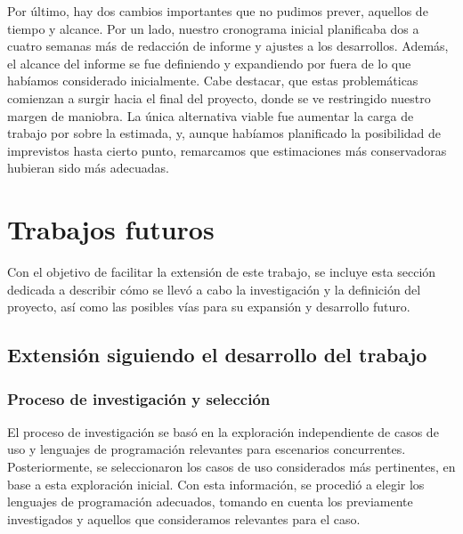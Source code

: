 \documentclass[11pt]{article}
\let\Oldsection\section
\renewcommand{\section}{\FloatBarrier\Oldsection}
\let\Oldsubsection\subsection
\renewcommand{\subsection}{\FloatBarrier\Oldsubsection}
\let\Oldsubsubsection\subsubsection
\renewcommand{\subsubsection}{\FloatBarrier\Oldsubsubsection}
\begin{document}
Por último, hay dos cambios importantes que no pudimos prever, aquellos de tiempo y alcance. Por un lado, nuestro cronograma inicial planificaba dos a cuatro semanas más de redacción de informe y ajustes a los desarrollos. Además, el alcance del informe se fue definiendo y expandiendo por fuera de lo que habíamos considerado inicialmente. Cabe destacar, que estas problemáticas comienzan a surgir hacia el final del proyecto, donde se ve restringido nuestro margen de maniobra. La única alternativa viable fue aumentar la carga de trabajo por sobre la estimada, y, aunque habíamos planificado la posibilidad de imprevistos hasta cierto punto, remarcamos que estimaciones más conservadoras hubieran sido más adecuadas.

\newpage

\section{Trabajos futuros}

Con el objetivo de facilitar la extensión de este trabajo, se incluye esta sección dedicada a describir cómo se llevó a cabo la investigación y la definición del proyecto, así como las posibles vías para su expansión y desarrollo futuro.

\subsection{Extensión siguiendo el desarrollo del trabajo}

\subsubsection{Proceso de investigación y selección}

El proceso de investigación se basó en la exploración independiente de casos de uso y lenguajes de programación relevantes para escenarios concurrentes. Posteriormente, se seleccionaron los casos de uso considerados más pertinentes, en base a esta exploración inicial. Con esta información, se procedió a elegir los lenguajes de programación adecuados, tomando en cuenta los previamente investigados y aquellos que consideramos relevantes para el caso.
\end{document}
